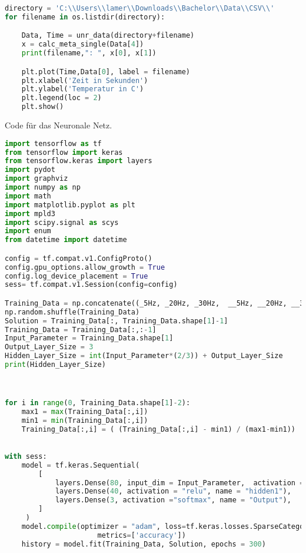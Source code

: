 \begin{lstlisting}[language = Python]
directory = 'C:\\Users\\lamer\\Downloads\\Bachelor\\Data\\CSV\\'
for filename in os.listdir(directory):

    Data, Time = unr_data(directory+filename)
    x = calc_meta_single(Data[4])
    print(filename,": ", x[0], x[1])

    plt.plot(Time,Data[0], label = filename)
    plt.xlabel('Zeit in Sekunden')
    plt.ylabel('Temperatur in C')
    plt.legend(loc = 2)
    plt.show()

\end{lstlisting}




\newpage

Code für das Neuronale Netz. 
\begin{lstlisting}[language = Python]
import tensorflow as tf
from tensorflow import keras
from tensorflow.keras import layers
import pydot 
import graphviz
import numpy as np
import math
import matplotlib.pyplot as plt
import mpld3
import scipy.signal as scys
import enum
from datetime import datetime

config = tf.compat.v1.ConfigProto()
config.gpu_options.allow_growth = True
config.log_device_placement = True
sess= tf.compat.v1.Session(config=config)

Training_Data = np.concatenate((_5Hz, _20Hz, _30Hz,  __5Hz, __20Hz, __30Hz,___5Hz, ___20Hz, ___30Hz), axis =0)
np.random.shuffle(Training_Data)
Solution = Training_Data[:, Training_Data.shape[1]-1]
Training_Data = Training_Data[:,:-1]
Input_Parameter = Training_Data.shape[1]
Output_Layer_Size = 3
Hidden_Layer_Size = int(Input_Parameter*(2/3)) + Output_Layer_Size
print(Hidden_Layer_Size)



for i in range(0, Training_Data.shape[1]-2):
    max1 = max(Training_Data[:,i])
    min1 = min(Training_Data[:,i])
    Training_Data[:,i] = ( (Training_Data[:,i] - min1) / (max1-min1))
    

with sess:
    model = tf.keras.Sequential(
        [
            layers.Dense(80, input_dim = Input_Parameter,  activation ="relu", name = "Start"),
            layers.Dense(40, activation = "relu", name = "hidden1"),
            layers.Dense(3, activation ="softmax", name = "Output"),
        ]
     )
    model.compile(optimizer = "adam", loss=tf.keras.losses.SparseCategoricalCrossentropy(from_logits=True),
                      metrics=['accuracy'])
    history = model.fit(Training_Data, Solution, epochs = 300)
   
\end{lstlisting}
